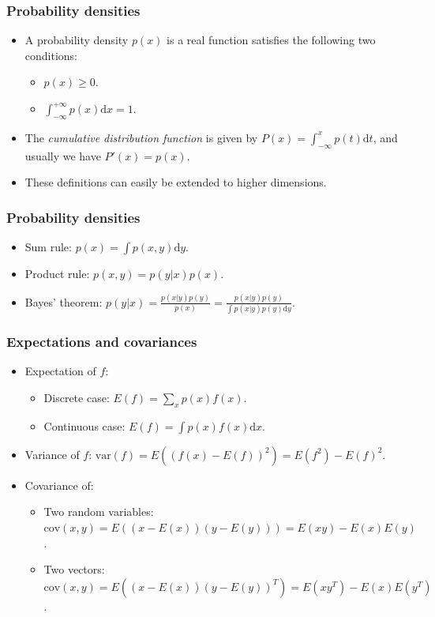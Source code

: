 \documentclass{beamer}
\begin{document}
\begin{frame}
    \frametitle{Probability densities}
    \begin{itemize}
        \item A probability density $p(x)$ is a real function satisfies the following two conditions\footnotemark:
        \begin{itemize}
            \item $p(x)\ge{}0$.
            \item $\int_{-\infty}^{+\infty}p(x)\mathrm{d}x=1$.
        \end{itemize}
        \item The \emph{cumulative distribution function} is given by $P(x)=\int_{-\infty}^{x}p(t)\mathrm{d}t$, and usually we have $P'(x)=p(x)$.
        \item These definitions can easily be extended to higher dimensions.
    \end{itemize}
\end{frame}

\begin{frame}
    \frametitle{Probability densities}
    \begin{itemize}
        \item Sum rule: $p(x)=\int{}p(x,y)\mathrm{d}y$.
        \item Product rule: $p(x,y)=p(y|x)p(x)$.
        \item Bayes' theorem: $p(y|x)=\frac{p(x|y)p(y)}{p(x)}=\frac{p(x|y)p(y)}{\int{}p(x|y)p(y)\mathrm{d}y}$.
    \end{itemize}
\end{frame}

\begin{frame}
    \frametitle{Expectations and covariances}
    \begin{itemize}
        \item Expectation of $f$:
        \begin{itemize}
            \item Discrete case: $E(f)=\sum_{x}p(x)f(x)$.
            \item Continuous case: $E(f)=\int{}p(x)f(x)\mathrm{d}x$.
        \end{itemize}
        \item Variance of $f$: $\mathrm{var}(f)=E((f(x)-E(f))^{2})=E(f^{2})-E(f)^{2}$.
        \item Covariance of:
        \begin{itemize}
            \item Two random variables: $\mathrm{cov}(x,y)=E((x-E(x))(y-E(y)))=E(xy)-E(x)E(y)$.
            \item Two vectors: $\mathrm{cov}(x,y)=E((x-E(x))(y-E(y))^{T})=E(xy^{T})-E(x)E(y^{T})$.
        \end{itemize}
    \end{itemize}
\end{frame}
\end{document}
